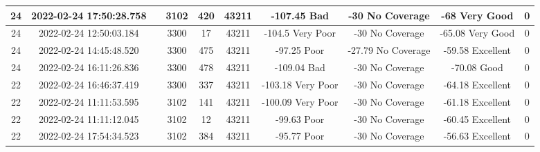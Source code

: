 \begin{longtable*}{|c|c|c|c|c|c|c|c|c|c|}
24&2022-02-24 17:50:28.758&&3102&420&43211& -107.45   Bad         & -30       No Coverage & -68       Very Good   & 0\\\hline
{}24&2022-02-24 12:50:03.184&&3300&17&43211& -104.5    Very Poor   & -30       No Coverage & -65.08    Very Good   & 0\\\hline
{}24&2022-02-24 14:45:48.520&&3300&475&43211& -97.25    Poor        & -27.79    No Coverage & -59.58    Excellent   & 0\\\hline
{}24&2022-02-24 16:11:26.836&&3300&478&43211& -109.04   Bad         & -30       No Coverage & -70.08    Good        & 0\\\hline
{}22&2022-02-24 16:46:37.419&&3300&337&43211& -103.18   Very Poor   & -30       No Coverage & -64.18    Excellent   & 0\\\hline
{}22&2022-02-24 11:11:53.595&&3102&141&43211& -100.09   Very Poor   & -30       No Coverage & -61.18    Excellent   & 0\\\hline
{}22&2022-02-24 11:11:12.045&&3102&12&43211& -99.63    Poor        & -30       No Coverage & -60.45    Excellent   & 0\\\hline
{}22&2022-02-24 17:54:34.523&&3102&384&43211& -95.77    Poor        & -30       No Coverage & -56.63    Excellent   & 0\\\hline

\end{longtable*}
